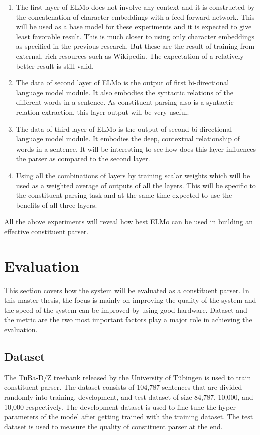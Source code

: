 \documentclass[a4paper, 11pt]{article}
\begin{document}
\begin{enumerate}
\item The first layer of ELMo does not involve any context and it is constructed by the concatenation of character embeddings with a feed-forward network. This will be used as a base model for these experiments and it is expected to give least favorable result. This is much closer to using only character embeddings as specified in the previous research. But these are the result of training from external, rich resources such as Wikipedia. The expectation of a relatively better result is still valid.
\item The data of second layer of ELMo is the output of first bi-directional language model module. It also embodies the syntactic relations of the different words in a sentence. As constituent parsing also is a syntactic relation extraction, this layer output will be very useful. 
\item The data of third layer of ELMo is the output of second bi-directional language model module. It embodies the deep, contextual relationship of words in a sentence. It will be interesting to see how does this layer influences the parser as compared to the second layer.   
\item Using all the combinations of layers by training scalar weights which will be used as a weighted average of outputs of all the layers. This will be specific to the constituent parsing task and at the same time expected to use the benefits of all three layers. 
\end{enumerate}

All the above experiments will reveal how best ELMo can be used in building an effective constituent parser. 


\pagebreak
\section{Evaluation}

This section covers how the system will be evaluated as a constituent parser. In this master thesis, the focus is mainly on improving the quality of the system and the speed of the system can be improved by using good hardware. Dataset and the metric are the two most important factors play a major role in achieving the evaluation. 
\subsection{Dataset}

The TüBa-D/Z treebank \parencite{TubingenTreebank} released by the University of Tübingen is used to train constituent parser. The dataset consists of 104,787 sentences that are divided randomly into training, development, and test dataset of size 84,787, 10,000, and 10,000 respectively. The development dataset is used to fine-tune the hyper-parameters of the model after getting trained with the training dataset. The test dataset is used to measure the quality of constituent parser at the end. 
\end{document}
